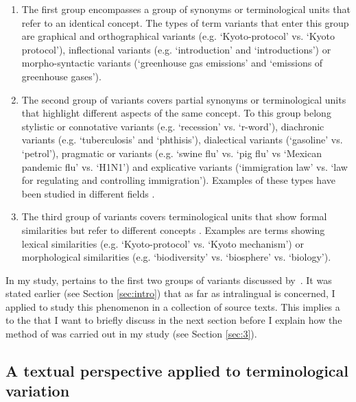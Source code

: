 \documentclass[output=paper]{langsci/langscibook.cls}
\begin{document}
\begin{enumerate}
	
\item The first group encompasses a group of synonyms or terminological units that 
refer to an identical concept. The types of term variants that enter this group 
are graphical and orthographical variants (e.g. `Kyoto-protocol' vs. `Kyoto protocol'), 
inflectional variants (e.g. `introduction' and `introductions') or morpho-syntactic 
variants (`greenhouse gas emissions' and `emissions of greenhouse gases'). 

\item The second group of variants covers partial synonyms or terminological units 
that highlight different aspects of the same concept. To this group belong stylistic 
or connotative variants (e.g. `recession' vs. `r-word'), diachronic variants (e.g. 
`tuberculosis' and `phthisis'), dialectical variants (`gasoline' vs. `petrol'), 
pragmatic or  variants (e.g. `swine flu' vs. `pig flu' vs `Mexican pandemic 
flu' vs. `H1N1') and explicative variants (`immigration law' vs. `law for regulating 
and controlling immigration'). Examples of these types have been studied in different 
fields \citep{Temmerman1997,Resche2000,FernandezSilva2010}.

\item The third group of variants covers terminological units that show formal similarities 
but refer to different concepts \cite{DailleEtAL1996,ArlinEtAl2006,BowkerHawkins2006,Depierre2007}. Examples are terms showing lexical similarities 
(e.g. `Kyoto-protocol' vs. `Kyoto mechanism') or morphological similarities (e.g. 
`biodiversity' vs. `biosphere' vs. `biology'). 
\end{enumerate}

In my study,  pertains to the first two groups of variants 
discussed by~\citet{AguadoDeCeaMontielPonsoda2012}. It was stated earlier (see 
Section \ref{sec:intro}) that as far as intralingual  is concerned, 
I applied  to study this phenomenon in a collection of source texts. This implies a  to the  
that I want to briefly discuss in the next section before I explain how the method of  was carried out in my study (see Section \ref{sec:3}). \label{HRef445046646}

\subsection{A textual perspective applied to terminological variation}\label{sec:2.2}
\end{document}

